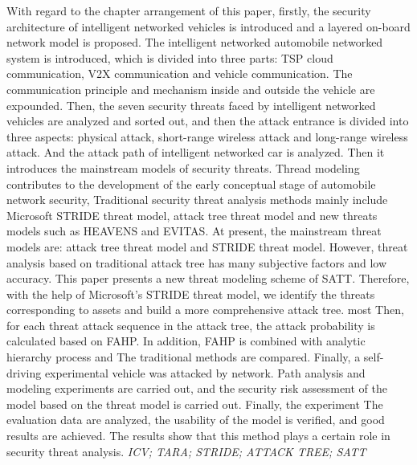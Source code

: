 With regard to the chapter arrangement of this paper, firstly, the security architecture of intelligent networked vehicles is introduced and a layered on-board network model is proposed.
The intelligent networked automobile networked system is introduced, which is divided into three parts: TSP cloud communication, V2X communication and vehicle communication.
The communication principle and mechanism inside and outside the vehicle are expounded.
Then, the seven security threats faced by intelligent networked vehicles are analyzed and sorted out, and then the attack entrance is divided into three aspects: physical attack, short-range wireless attack and long-range wireless attack.
And the attack path of intelligent networked car is analyzed. Then it introduces the mainstream models of security threats. Thread modeling contributes to the development of the early conceptual stage of automobile network security,
Traditional security threat analysis methods mainly include Microsoft STRIDE threat model, attack tree threat model and new threats models such as HEAVENS and EVITAS.
At present, the mainstream threat models are: attack tree threat model and STRIDE threat model.
However, threat analysis based on traditional attack tree has many subjective factors and low accuracy. This paper presents a new threat modeling scheme of SATT.
Therefore, with the help of Microsoft's STRIDE threat model, we identify the threats corresponding to assets and build a more comprehensive attack tree. most
Then, for each threat attack sequence in the attack tree, the attack probability is calculated based on FAHP. In addition, FAHP is combined with analytic hierarchy process and
The traditional methods are compared. Finally, a self-driving experimental vehicle was attacked by network.
Path analysis and modeling experiments are carried out, and the security risk assessment of the model based on the threat model is carried out. Finally, the experiment
The evaluation data are analyzed, the usability of the model is verified, and good results are achieved.
The results show that this method plays a certain role in security threat analysis.
{}\textit{ICV; TARA; STRIDE; ATTACK TREE; SATT}